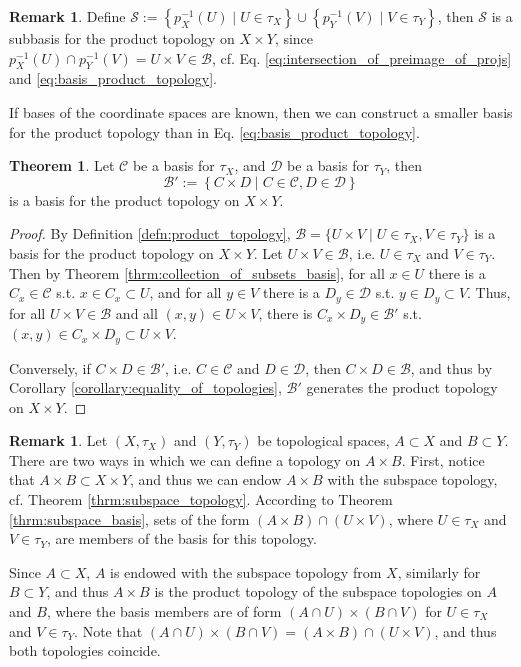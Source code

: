 \documentclass[12pt, a4paper]{article}
\numberwithin{equation}{section}
\theoremstyle{definition}
\theoremstyle{definition}
\newtheorem{remark}[thm]{Remark} %
\newtheorem{theorem}[thm]{Theorem}
\begin{document}
		\begin{remark}
			Define $\mathscr S := \left\{ p_X^{-1}(U) \mid U\in\tau_X \right\} \cup \left\{ p_Y^{-1}(V) \mid V\in\tau_Y \right\}$, then $\mathscr S$ is a subbasis for the product topology on $X\times Y$, since $p_X^{-1}(U) \cap p_Y^{-1}(V) = U\times V\in \mathscr B$, cf. Eq. \eqref{eq:intersection_of_preimage_of_projs} and \eqref{eq:basis_product_topology}.
		\end{remark}
	
		If bases of the coordinate spaces are known, then we can construct a smaller basis for the product topology than in Eq. \eqref{eq:basis_product_topology}.
		
		\begin{theorem}\label{thrm:basis_product_topology_coarser}
			Let $\mathscr C$ be a basis for $\tau_X$, and $\mathscr D$ be a basis for $\tau_Y$, then
			$$\mathscr B' := \left\{C\times D \mid C\in \mathscr C, D\in \mathscr D\right\}$$
			is a basis for the product topology on $X\times Y$.
		\end{theorem}
		
		\begin{proof}
			By Definition \ref{defn:product_topology}, $\mathscr B = \{ U\times V \mid U\in\tau_X, V\in\tau_Y \}$ is a basis for the product topology on $X\times Y$. Let $U\times V\in \mathscr B$, i.e. $U\in\tau_X$ and $V\in\tau_Y$. Then by Theorem \ref{thrm:collection_of_subsets_basis}, for all $x\in U$ there is a $C_x\in \mathscr C$ s.t. $x\in C_x\subset U$, and for all $y\in V$ there is a $D_y\in\mathscr D$ s.t. $y\in D_y\subset V$. Thus, for all $U\times V\in \mathscr B$ and all $(x, y)\in U\times V$, there is $C_x\times D_y\in \mathscr B'$ s.t. $(x, y)\in C_x\times D_y\subset U\times V$.
			
			Conversely, if $C\times D\in \mathscr B'$, i.e. $C\in\mathscr C$ and $D\in\mathscr D$, then $C\times D\in\mathscr B$, and thus by Corollary \ref{corollary:equality_of_topologies}, $\mathscr B'$ generates the product topology on $X\times Y$.
		\end{proof}
	
		\begin{remark}
			Let $(X, \tau_X)$ and $(Y, \tau_Y)$ be topological spaces, $A\subset X$ and $B\subset Y$. There are two ways in which we can define a topology on $A\times B$. First, notice that $A\times B\subset X\times Y$, and thus we can endow $A\times B$ with the subspace topology, cf. Theorem \ref{thrm:subspace_topology}. According to Theorem \ref{thrm:subspace_basis}, sets of the form $(A\times B) \cap (U\times V)$, where $U\in\tau_X$ and $V\in\tau_Y$, are members of the basis for this topology.
			
			Since $A\subset X$, $A$ is endowed with the subspace topology from $X$, similarly for $B\subset Y$, and thus $A\times B$ is the product topology of the subspace topologies on $A$ and $B$, where the basis members are of form $(A\cap U)\times (B\cap V)$ for $U\in\tau_X$ and $V\in\tau_Y$. Note that $(A\cap U)\times (B\cap V) = (A\times B)\cap (U\times V)$, and thus both topologies coincide.
		\end{remark}
	
\end{document}
